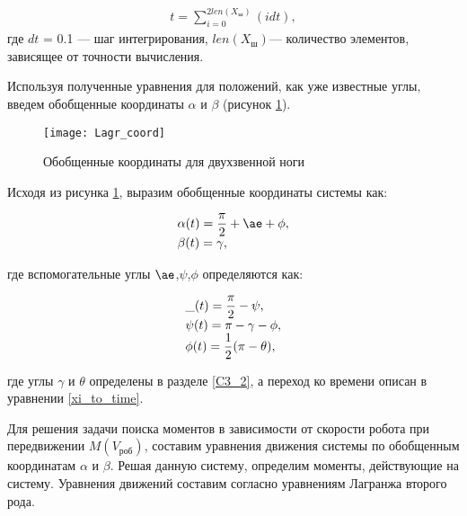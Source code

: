 \begin{equation}
	\begin{array}{l}
		t = \displaystyle\sum_{i=0}^{2len(X_{\text{ш}})}(idt),
	\end{array}
	\label{xi_to_time}
\end{equation}
где $dt$ = 0.1 --- шаг интегрирования, $len(X_{\text{ш}})$--- количество элементов, зависящее от точности вычисления.

Используя полученные уравнения для положений, как уже известные углы, введем обобщенные координаты $\alpha$ и $\beta$ (рисунок \ref{Lagr_coord}).

\newpage
\begin{figure}[h!]
	\begin{center}
		\texttt{[image: Lagr\_coord]}
		\caption{{Обобщенные координаты для двухзвенной ноги}}
		\label{Lagr_coord}
	\end{center}
\end{figure}

Исходя из рисунка \ref{Lagr_coord}, выразим обобщенные координаты системы как:

\begin{equation}
	\begin{array}{l}
		\alpha(t) = \displaystyle\frac{\pi}{2} + \ae + \phi,
		\\
		\beta(t)=\gamma,
	\end{array}
	\label{ab}
\end{equation}

где вспомогательные углы $\ae$,$\psi$,$\phi$ определяются как: 

\begin{equation}
	\begin{array}{l}
		\ae(t) = \displaystyle\frac{\pi}{2}-\psi,
		\\
		\psi(t) = \pi-\gamma-\phi,
		\\
		\phi(t)=\displaystyle\frac{1}{2}(\pi-\theta),
	\end{array}
	\label{add_coord}
\end{equation}

где углы $\gamma$ и $\theta$ определены в разделе \ref{C3_2}, а переход ко времени описан в уравнении \ref{xi_to_time}.

Для решения задачи поиска моментов в зависимости от скорости робота при передвижении $M(V_{\text{роб}})$, составим уравнения движения системы по обобщенным координатам $\alpha$ и $\beta$. Решая данную систему, определим моменты, действующие на систему.
Уравнения движений составим согласно уравнениям Лагранжа второго рода\cite{Lagr}.

